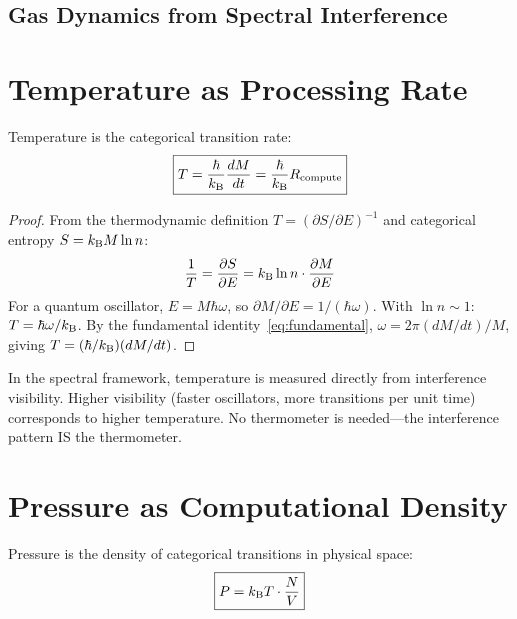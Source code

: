 \subsection{Gas Dynamics from Spectral Interference}
\label{part:gas_dynamics}

\section{Temperature as Processing Rate}
\label{sec:temperature}

\begin{theorem}
\label{thm:temperature}
Temperature is the categorical transition rate:
\begin{equation}
\boxed{T = \frac{\hbar}{k_{\mathrm{B}}}\frac{dM}{dt} = \frac{\hbar}{k_{\mathrm{B}}}R_{\mathrm{compute}}}
\end{equation}
\end{theorem}

\begin{proof}
From the thermodynamic definition $T = (\partial S/\partial E)^{-1}$ and categorical entropy $S = k_{\mathrm{B}} M \ln n$:
\begin{equation}
    \frac{1}{T} = \frac{\partial S}{\partial E} = k_{\mathrm{B}} \ln n \cdot \frac{\partial M}{\partial E}
\end{equation}
For a quantum oscillator, $E = M\hbar\omega$, so $\partial M/\partial E = 1/(\hbar\omega)$. With $\ln n \sim 1$: $T = \hbar\omega/k_{\mathrm{B}}$. By the fundamental identity~\eqref{eq:fundamental}, $\omega = 2\pi(dM/dt)/M$, giving $T = (\hbar/k_{\mathrm{B}})(dM/dt)$.
\end{proof}

\begin{corollary}
In the spectral framework, temperature is measured directly from interference visibility. Higher visibility (faster oscillators, more transitions per unit time) corresponds to higher temperature. No thermometer is needed---the interference pattern IS the thermometer.
\end{corollary}

\section{Pressure as Computational Density}
\label{sec:pressure}

\begin{theorem}
\label{thm:pressure}
Pressure is the density of categorical transitions in physical space:
\begin{equation}
\boxed{P = k_{\mathrm{B}} T \cdot \frac{N}{V}}
\end{equation}
\end{theorem}

